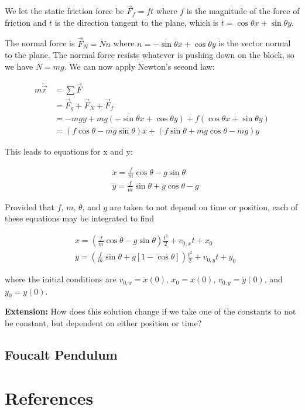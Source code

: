 \documentclass[main.tex]{subfiles}
\begin{document}
\begin{appendices}
We let the static friction force be $\vec{F}_f = f \unit{t}$ where $f$ is the magnitude
of the force of friction and $\unit{t}$ is the direction tangent to the plane, which is
$\unit{t} = \cos \theta \unit{x} + \sin \theta \unit{y}$.

The normal force is $\vec{F}_N = N \unit{n}$ where $\unit{n} = - \sin \theta \unit{x} +
\cos \theta \unit{y}$ is the vector normal to the plane. The normal force resists whatever
is pushing down on the block, so we have $N = mg$. We can now apply Newton's second
law:

\begin{align*}
m \ddot{\vec{r}} &= \sum \vec{F} \\
&= \vec{F}_g + \vec{F}_N + \vec{F}_f \\
&= -mg\unit{y} + mg \left(- \sin \theta \unit{x} + \cos \theta \unit{y} \right) + f \left(
\cos \theta \unit{x} + \sin \theta \unit{y} \right) \\
&= \left( f \cos \theta - mg \sin \theta \right) \unit{x} + \left( f \sin \theta + mg \cos
\theta - mg \right) \unit{y}
\end{align*}

This leads to equations for x and y:

\begin{align*}
&\ddot{x} = \frac{f}{m} \cos \theta - g \sin \theta \\
&\ddot{y} = \frac{f}{m} \sin \theta + g \cos \theta - g
\end{align*}

Provided that $f$, $m$, $\theta$, and $g$ are taken to not depend on time or position,
each of these equations may be integrated to find

\begin{align*}
& x = \left( \frac{f}{m} \cos \theta - g \sin \theta \right) \frac{t^2}{2} + v_{0,x} t
+ x_0 \\
& y = \left( \frac{f}{m} \sin \theta + g \left[ 1 - \cos \theta \right] \right) \frac{t^2}{2}
+ v_{0,y} t + y_0
\end{align*}

where the initial conditions are $v_{0,x} = \dot{x}(0)$, $x_0 = x(0)$, $v_{0,y} =
\dot{y}(0)$, and $y_0 = y(0)$.

\textbf{Extension:} How does this solution change if we take one of the constants to not be constant, but
dependent on either position or time?


\section{Foucalt Pendulum}

\chapter{References}



\end{appendices}
\end{document}
